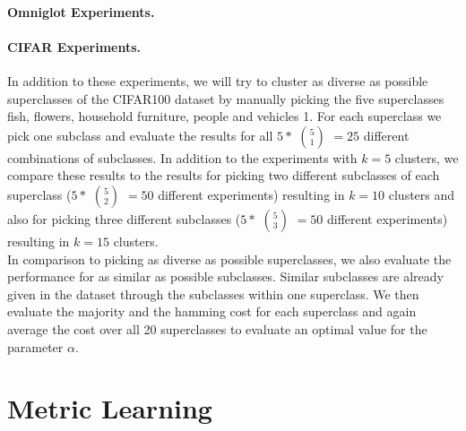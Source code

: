 \paragraph{Omniglot Experiments.}

\paragraph{CIFAR Experiments.} In addition to these experiments, we will try to cluster as diverse as possible superclasses of the CIFAR100 dataset by manually picking the five superclasses fish, flowers, household furniture, people and vehicles 1. For each superclass we pick one subclass and evaluate the results for all $5 *$ $5 \choose 1$ $= 25$ different combinations of subclasses. In addition to the experiments with $k = 5$ clusters, we compare these results to the results for picking two different subclasses of each superclass ($5 *$ $5 \choose 2$ $= 50$ different experiments) resulting in $k = 10$ clusters and also for picking three different subclasses ($5 *$ $5 \choose 3$ $= 50$ different experiments) resulting in $k = 15$ clusters.\\

In comparison to picking as diverse as possible superclasses, we also evaluate the performance for as similar as possible subclasses. Similar subclasses are already given in the dataset through the subclasses within one superclass. We then evaluate the majority and the hamming cost for each superclass and again average the cost over all 20 superclasses to evaluate an optimal value for the parameter $\alpha$.

\section{Metric Learning}